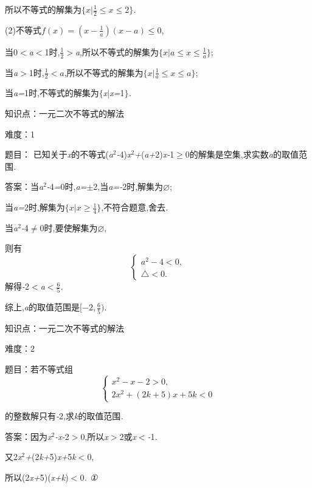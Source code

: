 \documentclass{article} %
\begin{document}
所以不等式的解集为$\mathrm{\{}$$ x | \frac{1}{2} \le x \le 2$$\mathrm{\}}$\textit{.}

(2)不等式$f(x)=(x-\frac{1}{a})(x-a)\le 0$,

当0\textit{$<$a$<$}1时,$\frac{1}{2}$\textit{$>$a},所以不等式的解集为$\mathrm{\{}$$x|a \le x \le \frac{1}{a}$$\mathrm{\}}$;

当\textit{a$>$}1时,$\frac{1}{2}<a$,所以不等式的解集为$\mathrm{\{}$$x | \frac{1}{a}\le x \le a$$\mathrm{\}}$;

当\textit{a=}1时,不等式的解集为$\mathrm{\{}$\textit{x$ |$x=}1$\mathrm{\}}$\textit{.}


知识点：一元二次不等式的解法

难度：1

 题目：
已知关于\textit{x}的不等式(\textit{a}${}^{2}$\textit{-}4)\textit{x}${}^{2}$\textit{+}(\textit{a+}2)\textit{x-}1$\mathrm{\ge}$0的解集是空集,求实数\textit{a}的取值范围\textit{.}

 答案：当\textit{a}${}^{2}$\textit{-}4\textit{=}0时,\textit{a=$\pm$}2,当\textit{a=-}2时,解集为$\mathrm{\varnothing }$;

当\textit{a=}2时,解集为$\mathrm{\{} x|x \ge \frac{1}{4} \mathrm{\}}$,不符合题意,舍去\textit{.}

当\textit{a}${}^{2}$\textit{-}4$\mathrm{\neq}$0时,要使解集为$\mathrm{\varnothing }$,

则有
\[
\begin{cases}
a^2-4 <0,\\
\bigtriangleup <0.
\end{cases}
\]
解得\textit{-}2\textit{$<$a$<\frac{6}{5}$}\textit{.}

综上,\textit{a}的取值范围是$[ -2, \frac{6}{5} )$.

知识点：一元二次不等式的解法

难度：2

 题目：若不等式组
\[
\begin{cases}
x^2-x-2>0,\\
2x^2+(2k+5)x+5k<0
\end{cases}
\]

 的整数解只有\textit{-}2,求\textit{k}的取值范围\textit{.}

 答案：因为\textit{x}${}^{2}$\textit{-x-}2\textit{$>$}0,所以\textit{x$>$}2或\textit{x$<$-}1\textit{.}

又2\textit{x}${}^{2}$\textit{+}(2\textit{k+}5)\textit{x+}5\textit{k$<$}0,

所以(2\textit{x+}5)(\textit{x+k})\textit{$<$}0\textit{. ①}
\end{document}
